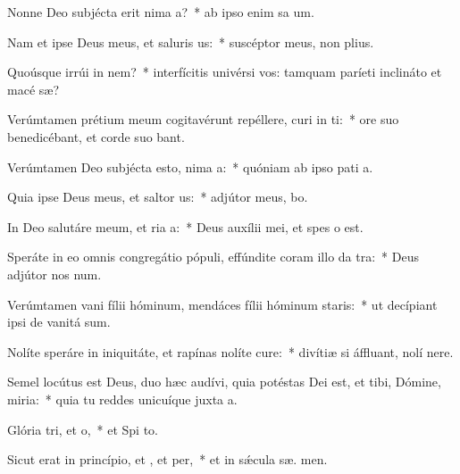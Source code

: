 \item Nonne Deo subjécta erit nima a?~* ab ipso enim sa um.
\item Nam et ipse Deus meus, et saluris us:~* suscéptor meus, non  plius.
\item Quoúsque irrúi in nem?~* interfícitis univérsi vos: tamquam paríeti inclináto et macé sæ?
\item Verúmtamen prétium meum cogitavérunt repéllere, curi in ti:~* ore suo benedicébant, et corde suo bant.
\item Verúmtamen Deo subjécta esto, nima a:~* quóniam ab ipso pati a.
\item Quia ipse Deus meus, et saltor us:~* adjútor meus,  bo.
\item In Deo salutáre meum, et ria a:~* Deus auxílii mei, et spes   o est.
\item Speráte in eo omnis congregátio pópuli, effúndite coram illo da tra:~* Deus adjútor nos  num.
\item Verúmtamen vani fílii hóminum, mendáces fílii hóminum  staris:~* ut decípiant ipsi de vanitá  sum.
\item Nolíte speráre in iniquitáte, et rapínas nolíte cure:~* divítiæ si áffluant, nolí  nere.
\item Semel locútus est Deus, duo hæc audívi, quia potéstas Dei est, et tibi, Dómine, miria:~* quia tu reddes unicuíque juxta  a.
\item Glória tri, et o,~* et Spi to.
\item Sicut erat in princípio, et , et per,~* et in sǽcula sæ. men.

